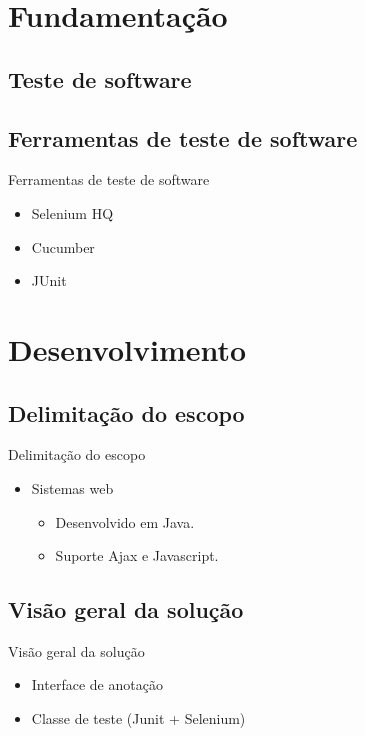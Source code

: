 \documentclass{beamer}
\begin{document}
\section{Fundamentação}
\subsection{Teste de software}
\subsection{Ferramentas de teste de software}
\begin{frame}{Ferramentas de teste de software}
	\begin{itemize}
		\item Selenium HQ
		\item Cucumber
		\item JUnit
	\end{itemize}
\end{frame}
\section{Desenvolvimento}
\subsection{Delimitação do escopo}
\begin{frame}{Delimitação do escopo}
	\begin{itemize}
		\item Sistemas web
		\begin{itemize}
			\item Desenvolvido em Java.
			\item Suporte Ajax e Javascript.
		\end{itemize}
	\end{itemize}
\end{frame}
\subsection{Visão geral da solução}
\begin{frame}{Visão geral da solução}
    \begin{itemize}
		\item Interface de anotação 
		\item Classe de teste (Junit + Selenium) 
	\end{itemize}
\end{frame}
\end{document}
